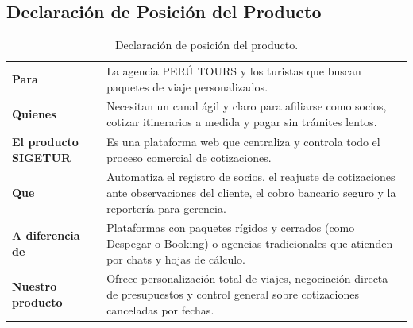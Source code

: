 \subsection{Declaración de Posición del Producto}
\begin{table}[H]
\centering
\footnotesize
\begin{tabularx}{\textwidth}{lX}
\toprule

\textbf{Para} & La agencia PERÚ TOURS y los turistas que buscan paquetes de viaje personalizados. \\ 
\textbf{Quienes} & Necesitan un canal ágil y claro para afiliarse como socios, cotizar itinerarios a medida y pagar sin trámites lentos. \\ 
\textbf{El producto SIGETUR} & Es una plataforma web que centraliza y controla todo el proceso comercial de cotizaciones. \\ 
\textbf{Que} & Automatiza el registro de socios, el reajuste de cotizaciones ante observaciones del cliente, el cobro bancario seguro y la reportería para gerencia. \\ 
\textbf{A diferencia de} & Plataformas con paquetes rígidos y cerrados (como Despegar o Booking) o agencias tradicionales que atienden por chats y hojas de cálculo. \\ 
\textbf{Nuestro producto} & Ofrece personalización total de viajes, negociación directa de presupuestos y control general sobre cotizaciones canceladas por fechas. \\ 
\bottomrule
\end{tabularx}
\caption{Declaración de posición del producto.}\label{tab:posicion}
\end{table}
